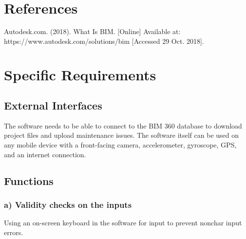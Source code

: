 \documentclass[onecolumn, draftclsnofoot,10pt, compsoc]{IEEEtran}
\begin{document}
\section{References}
    \hangindent=10mm\noindent [1] Autodesk.com. (2018). What Is BIM. [Online] Available at: https://www.autodesk.com/solutions/bim [Accessed 29 Oct. 2018]. \par

\section{Specific Requirements}
    \subsection{External Interfaces}
        \hangindent=10mm\noindent The software needs to be able to connect to the BIM 360 database to download project files and upload maintenance issues. The software itself can be used on any mobile device with a front-facing camera, accelerometer, gyroscope, GPS, and an internet connection. \par
    \subsection{Functions} %
        \subsubsection*{a) Validity checks on the inputs}
            \hangindent=10mm\noindent Using an on-screen keyboard in the software for input to prevent nonchar input errors. \par
            
\end{document}
